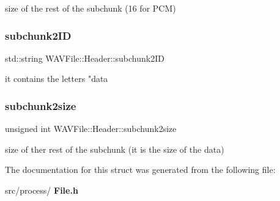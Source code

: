 size of the rest of the subchunk (16 for P\+CM) \mbox{\label{struct_w_a_v_file_1_1_header_a8623063c7d187207e3bca18930adacb2}} 
\subsubsection{subchunk2\+ID}
{\footnotesize\ttfamily std\+::string W\+A\+V\+File\+::\+Header\+::subchunk2\+ID}

it contains the letters "data \mbox{\label{struct_w_a_v_file_1_1_header_ad5ed192e56a65a330d7320769f49c5bc}} 
\subsubsection{subchunk2size}
{\footnotesize\ttfamily unsigned int W\+A\+V\+File\+::\+Header\+::subchunk2size}

size of ther rest of the subchunk (it is the size of the data) 

The documentation for this struct was generated from the following file\+:\begin{DoxyCompactItemize}
\item 
src/process/\textbf{ File.\+h}\end{DoxyCompactItemize}
